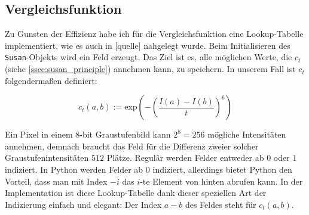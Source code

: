 \documentclass[a4paper, 11pt]{report}
\theoremstyle{definition}
\begin{document}
			\subsection{Vergleichsfunktion}
				Zu Gunsten der Effizienz habe ich für die Vergleichsfunktion eine Lookup-Tabelle implementiert, wie es auch in [quelle] nahgelegt wurde. Beim Initialisieren des \texttt{Susan}-Objekts wird ein Feld erzeugt. Das Ziel ist es, alle möglichen Werte, die $c_t$ (siehe \ref{ssec:susan_principle}) annehmen kann, zu speichern.
				In unserem Fall ist $c_t$ folgendermaßen definiert:
				
				$$
					c_t(a,b) :=
						\text{exp}\left(-\left(\frac{I(a) - I(b)}{t}\right)^6\right)
				$$
				
				Ein Pixel in einem 8-bit Graustufenbild kann $2^8 = 256$ mögliche Intensitäten annehmen, demnach braucht das Feld für die Differenz zweier solcher Graustufenintensitäten $512$ Plätze.
				Regulär werden Felder entweder ab $0$ oder $1$ indiziert. In Python werden Felder ab $0$ indiziert, allerdings bietet Python den Vorteil, dass man mit Index $-i$ das $i$-te Element von hinten abrufen kann. In der Implementation ist diese Lookup-Tabelle dank dieser speziellen Art der Indizierung einfach und elegant: Der Index $a-b$ des Feldes steht für $c_t(a,b)$.
\end{document}
